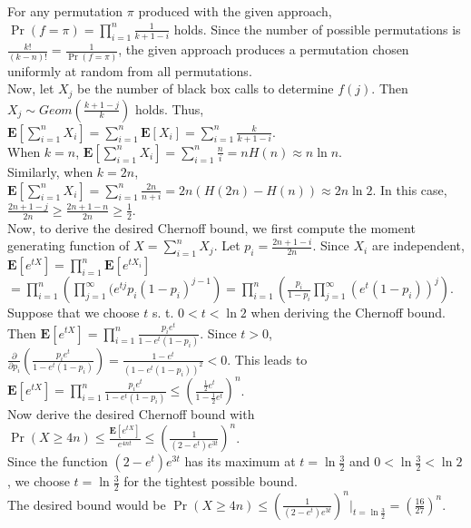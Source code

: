 \documentclass{article}
\begin{document}
\subsection{}
For any permutation $\pi$ produced with the given approach, $\Pr(f=\pi)=\prod\limits_{i=1}^n\frac{1}{k+1-i}$ holds.
Since the number of possible permutations is $\frac{k!}{(k-n)!}=\frac{1}{\Pr(f=\pi)}$,
the given approach produces a permutation chosen uniformly at random from all permutations.\\
Now, let $X_j$ be the number of black box calls to determine $f(j)$. Then $X_j\sim Geom(\frac{k+1-j}{k})$ holds.
Thus, $\textbf{E}[\sum\limits_{i=1}^nX_i]=\sum\limits_{i=1}^n\textbf{E}[X_i]=\sum\limits_{i=1}^n\frac{k}{k+1-i}$.\\
When $k=n$, $\textbf{E}[\sum\limits_{i=1}^nX_i]=\sum\limits_{i=1}^n\frac{n}{i}=nH(n)\approx n \ln n$.\\
Similarly, when $k=2n$, $\textbf{E}[\sum\limits_{i=1}^nX_i]=\sum\limits_{i=1}^n\frac{2n}{n+i}=2n(H(2n)-H(n))\approx2n\ln2$. In this case, $\frac{2n+1-j}{2n}\geq\frac{2n+1-n}{2n}\geq\frac{1}{2}$.\\
Now, to derive the desired Chernoff bound, we first compute the moment generating function of $X=\sum\limits_{i=1}^nX_j$.
Let $p_i=\frac{2n+1-i}{2n}$. Since $X_i$ are independent, $\textbf{E}[e^{tX}]=\prod\limits_{i=1}^n\textbf{E}[e^{tX_i}]$
$=\prod\limits_{i=1}^n\left(\prod\limits_{j=1}^\infty(e^{tj}p_i(1-p_i)^{j-1}\right)=\prod\limits_{i=1}^n\left(\frac{p_i}{1-p_i}\prod\limits_{j=1}^\infty(e^t(1-p_i))^j\right)$.\\
Suppose that we choose $t$ s. t. $0<t<\ln2$ when deriving the Chernoff bound.\\ Then $\textbf{E}[e^{tX}]=\prod\limits_{i=1}^n\frac{p_ie^t}{1-e^t(1-p_i)}$.
Since $t>0$, $\frac{\partial}{\partial p_i}\left(\frac{p_ie^t}{1-e^t(1-p_i)}\right)=\frac{1-e^t}{(1-e^t(1-p_i))^2}<0$.
This leads to $\textbf{E}[e^{tX}]=\prod\limits_{i=1}^n\frac{p_ie^t}{1-e^t(1-p_i)}\leq \left(\frac{\frac{1}{2}e^t}{1-\frac{1}{2}e^t}\right)^n$.\\
Now derive the desired Chernoff bound with $\Pr(X\geq 4n) \leq \frac{\textbf{E}[e^{tX}]}{e^{4nt}}\leq\left(\frac{1}{(2-e^t)e^{3t}}\right)^n$.\\
Since the function $(2-e^t)e^{3t}$ has its maximum at $t=\ln\frac{3}{2}$ and $0<\ln\frac{3}{2}<\ln2$, we choose $t=\ln\frac{3}{2}$ for the tightest possible bound.\\
The desired bound would be $\Pr(X\geq 4n) \leq \left(\frac{1}{(2-e^t)e^{3t}}\right)^n \Big|_{t=\ln\frac{3}{2}}=(\frac{16}{27})^n$.
\end{document}
